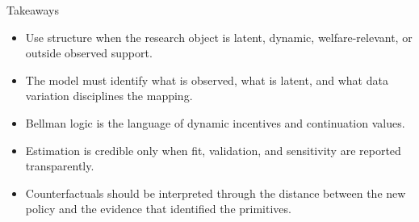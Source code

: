 \documentclass[aspectratio=169,11pt]{beamer}
\newcommand{\1}{\mathbf{1}}
\begin{document}
\begin{frame}{Takeaways}
\begin{itemize}
    \item Use structure when the research object is latent, dynamic, welfare-relevant, or outside observed support.
    \item The model must identify what is observed, what is latent, and what data variation disciplines the mapping.
    \item Bellman logic is the language of dynamic incentives and continuation values.
    \item Estimation is credible only when fit, validation, and sensitivity are reported transparently.
    \item Counterfactuals should be interpreted through the distance between the new policy and the evidence that identified the primitives.
\end{itemize}
\end{frame}
\end{document}

